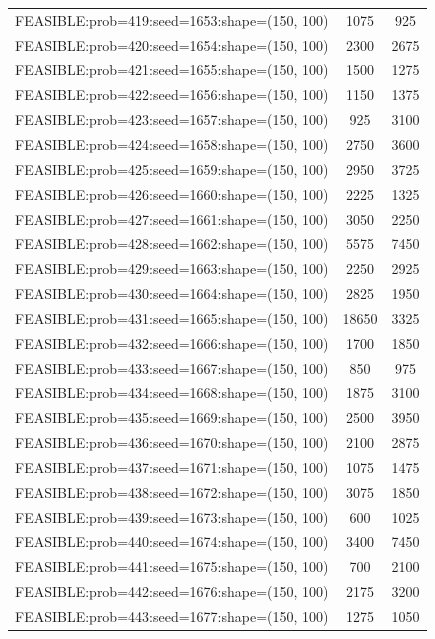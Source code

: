 \begin{longtable}{lcc}
FEASIBLE:prob=419:seed=1653:shape=(150, 100) &     1075 &   925 \\
FEASIBLE:prob=420:seed=1654:shape=(150, 100) &     2300 &  2675 \\
FEASIBLE:prob=421:seed=1655:shape=(150, 100) &     1500 &  1275 \\
FEASIBLE:prob=422:seed=1656:shape=(150, 100) &     1150 &  1375 \\
FEASIBLE:prob=423:seed=1657:shape=(150, 100) &      925 &  3100 \\
FEASIBLE:prob=424:seed=1658:shape=(150, 100) &     2750 &  3600 \\
FEASIBLE:prob=425:seed=1659:shape=(150, 100) &     2950 &  3725 \\
FEASIBLE:prob=426:seed=1660:shape=(150, 100) &     2225 &  1325 \\
FEASIBLE:prob=427:seed=1661:shape=(150, 100) &     3050 &  2250 \\
FEASIBLE:prob=428:seed=1662:shape=(150, 100) &     5575 &  7450 \\
FEASIBLE:prob=429:seed=1663:shape=(150, 100) &     2250 &  2925 \\
FEASIBLE:prob=430:seed=1664:shape=(150, 100) &     2825 &  1950 \\
FEASIBLE:prob=431:seed=1665:shape=(150, 100) &    18650 &  3325 \\
FEASIBLE:prob=432:seed=1666:shape=(150, 100) &     1700 &  1850 \\
FEASIBLE:prob=433:seed=1667:shape=(150, 100) &      850 &   975 \\
FEASIBLE:prob=434:seed=1668:shape=(150, 100) &     1875 &  3100 \\
FEASIBLE:prob=435:seed=1669:shape=(150, 100) &     2500 &  3950 \\
FEASIBLE:prob=436:seed=1670:shape=(150, 100) &     2100 &  2875 \\
FEASIBLE:prob=437:seed=1671:shape=(150, 100) &     1075 &  1475 \\
FEASIBLE:prob=438:seed=1672:shape=(150, 100) &     3075 &  1850 \\
FEASIBLE:prob=439:seed=1673:shape=(150, 100) &      600 &  1025 \\
FEASIBLE:prob=440:seed=1674:shape=(150, 100) &     3400 &  7450 \\
FEASIBLE:prob=441:seed=1675:shape=(150, 100) &      700 &  2100 \\
FEASIBLE:prob=442:seed=1676:shape=(150, 100) &     2175 &  3200 \\
FEASIBLE:prob=443:seed=1677:shape=(150, 100) &     1275 &  1050 \\

\end{longtable}

